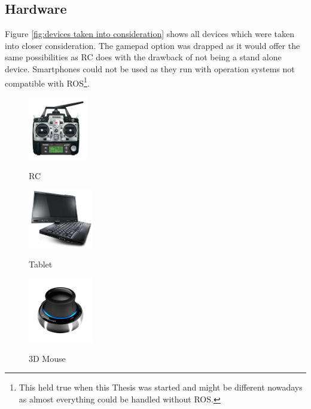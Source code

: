 \subsection{Hardware}
\label{sub:hardware}

Figure \ref{fig:devices taken into consideration} shows all devices which were taken into closer consideration. The gamepad option was drapped as it would offer the same possibilities as RC does with the drawback of not being a stand alone device. Smartphones could not be used as they run with operation systems not compatible with \textsc{ROS}\footnote{This held true when this Thesis was started and might be different nowadays as almost everything could be handled without ROS.}.

\begin{figure}[h]		
	\small{
		\begin{center}
			\parbox[b]{0.25\textwidth}{\includegraphics[width=0.23\textwidth]{futaba_7C_radio}
			\begin{center}RC \end{center}}
			\hspace{0.05\textwidth}
			\parbox[b]{0.25\textwidth}{\includegraphics[width=0.25\textwidth]{x220t_hero}
			\begin{center}Tablet \end{center}}
			\hspace{0.05 \textwidth}
			\parbox[b]{0.25\textwidth}{\includegraphics[width=0.25\textwidth]{3dx_productimage}
			\begin{center}3D Mouse \end{center}}			

\end{center}}
\end{figure}
